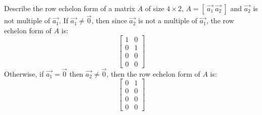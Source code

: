 \begin{exercise}
    Describe the row echelon form of a matrix $A$ of size $4 \times 2$, $A = \left[\ \vec{a_1} \ \vec{a_2} \ \right]$ and $\vec{a_2}$ is not multiple of $\vec{a_1}$.
    \Answer
    If $\vec{a_1} \neq \vec{0}$, then since $\vec{a_2}$ is not a multiple of $\vec{a_1}$, the row echelon form of $A$ is:
    \[
        \begin{bmatrix}
            1 & 0 \\
            0 & 1 \\
            0 & 0 \\
            0 & 0
        \end{bmatrix}
    \]
    Otherwise, if $\vec{a_1} = \vec{0}$ then $\vec{a_2} \neq \vec{0}$, then the row echelon form of $A$ is:
    \[
        \begin{bmatrix}
            0 & 1 \\
            0 & 0 \\
            0 & 0 \\
            0 & 0
        \end{bmatrix}
    \]
\end{exercise}

